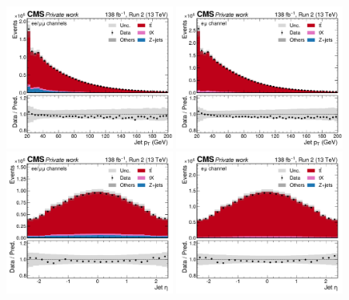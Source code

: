 \begin{figure}[!hp]
    \centering
    \includegraphics[width=0.49\textwidth]{figures/ah/controlplots/ReqMET/jet_pt__sf.pdf}
    \hfill
    \includegraphics[width=0.49\textwidth]{figures/ah/controlplots/ReqMET/jet_pt__em.pdf}
    \includegraphics[width=0.49\textwidth]{figures/ah/controlplots/ReqMET/jet_eta__sf.pdf}
    \hfill
    \includegraphics[width=0.49\textwidth]{figures/ah/controlplots/ReqMET/jet_eta__em.pdf}

\end{figure}
